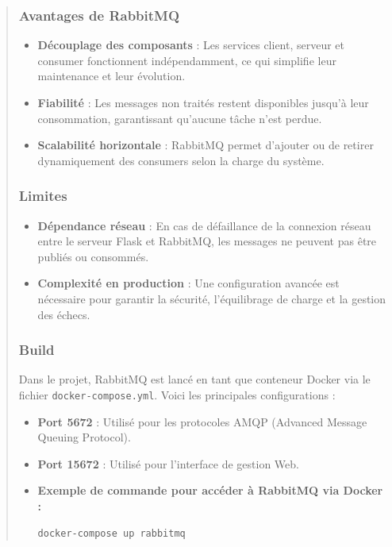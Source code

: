 \documentclass[12pt]{article}
\begin{document}
\begin{quote}
\subsubsection*{Avantages de RabbitMQ}
\begin{itemize}
    \item \textbf{Découplage des composants} : Les services client, serveur et consumer fonctionnent indépendamment, ce qui simplifie leur maintenance et leur évolution.
    \item \textbf{Fiabilité} : Les messages non traités restent disponibles jusqu'à leur consommation, garantissant qu'aucune tâche n'est perdue.
    \item \textbf{Scalabilité horizontale} : RabbitMQ permet d'ajouter ou de retirer dynamiquement des consumers selon la charge du système.
\end{itemize}

\subsubsection*{Limites}
\begin{itemize}
    \item \textbf{Dépendance réseau} : En cas de défaillance de la connexion réseau entre le serveur Flask et RabbitMQ, les messages ne peuvent pas être publiés ou consommés.
    \item \textbf{Complexité en production} : Une configuration avancée est nécessaire pour garantir la sécurité, l'équilibrage de charge et la gestion des échecs.
\end{itemize}


\subsubsection*{Build}
Dans le projet, RabbitMQ est lancé en tant que conteneur Docker via le fichier \texttt{docker-compose.yml}. Voici les principales configurations : \\
\begin{itemize}
    \item \textbf{Port 5672} : Utilisé pour les protocoles AMQP (Advanced Message Queuing Protocol).
    \item \textbf{Port 15672} : Utilisé pour l'interface de gestion Web.
    \item \textbf{Exemple de commande pour accéder à RabbitMQ via Docker :}
\begin{lstlisting}[language=bash]
docker-compose up rabbitmq
\end{lstlisting}
\end{itemize}


\end{quote}
\end{document}
